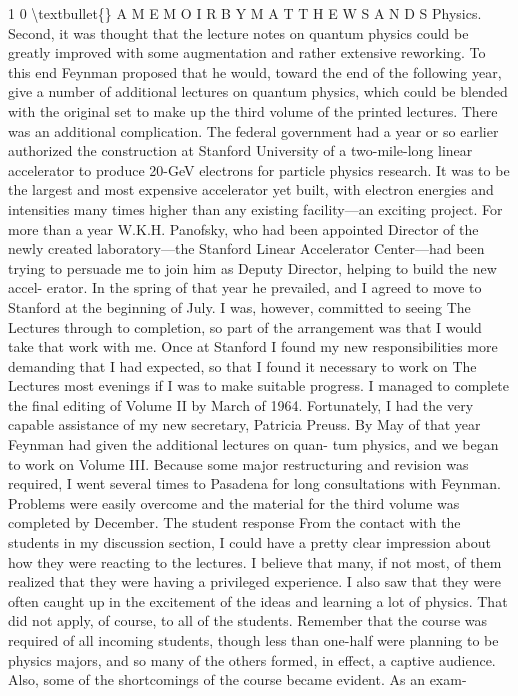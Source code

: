\documentclass[10pt,oneside]{article}
\begin{document}
1 0 \textbackslash{}textbullet\{\} A  M E M O I R  B Y  M A T T H E W  S A N D S Physics. Second, it was thought that the lecture notes on quantum physics could be greatly improved with some augmentation and rather extensive reworking. To this end Feynman proposed that he would, toward the end of the following year, give a number of additional lectures on quantum physics, which could be blended with the original set to make up the third volume of the printed lectures. There was an additional complication. The federal government had a year or so earlier authorized the construction at Stanford University of a two-mile-long linear accelerator to produce 20-GeV electrons for particle physics research. It was to be the largest and most expensive accelerator yet built, with electron energies and intensities many times higher than any existing facility---an exciting project. For more than a year W.K.H. Panofsky, who had been appointed Director of the newly created laboratory---the Stanford Linear Accelerator Center---had been trying to persuade me to join him as Deputy Director, helping to build the new accel- erator. In the spring of that year he prevailed, and I agreed to move to Stanford at the beginning of July. I was, however, committed to seeing The Lectures through to completion, so part of the arrangement was that I would take that work with me. Once at Stanford I found my new responsibilities more demanding that I had expected, so that I found it necessary to work on The Lectures most evenings if I was to make suitable progress. I managed to complete the final editing of Volume II by March of 1964. Fortunately, I had the very capable assistance of my new secretary, Patricia Preuss. By May of that year Feynman had given the additional lectures on quan- tum physics, and we began to work on Volume III. Because some major restructuring and revision was required, I went several times to Pasadena for long consultations with Feynman. Problems were easily overcome and the material for the third volume was completed by December. The student response From the contact with the students in my discussion section, I could have a pretty clear impression about how they were reacting to the lectures. I believe that many, if not most, of them realized that they were having a privileged experience. I also saw that they were often caught up in the excitement of the ideas and learning a lot of physics. That did not apply, of course, to all of the students. Remember that the course was required of all incoming students, though less than one-half were planning to be physics majors, and so many of the others formed, in effect, a captive audience. Also, some of the shortcomings of the course became evident. As an exam-\par
\end{document}
